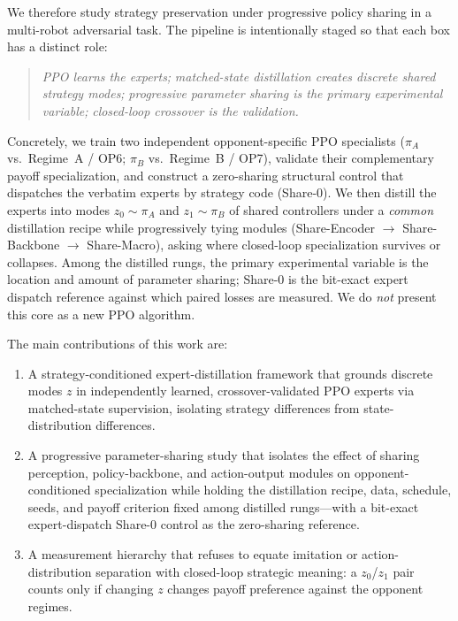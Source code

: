 We therefore study strategy preservation under progressive policy sharing in a
multi-robot adversarial task. The pipeline is intentionally staged so that each
box has a distinct role:
\begin{quote}
\emph{PPO learns the experts;}
\emph{matched-state distillation creates discrete shared strategy modes;}
\emph{progressive parameter sharing is the primary experimental variable;}
\emph{closed-loop crossover is the validation.}
\end{quote}
Concretely, we train two independent opponent-specific PPO specialists
($\pi_A$ vs.\ Regime~A / OP6; $\pi_B$ vs.\ Regime~B / OP7), validate their
complementary payoff specialization, and construct a zero-sharing structural
control that dispatches the verbatim experts by strategy code (Share-0). We then
distill the experts into modes $z_0\!\sim\!\pi_A$ and $z_1\!\sim\!\pi_B$ of
shared controllers under a \emph{common} distillation recipe while progressively
tying modules (Share-Encoder $\rightarrow$ Share-Backbone $\rightarrow$
Share-Macro), asking where closed-loop specialization survives or collapses.
Among the distilled rungs, the primary experimental variable is the location and
amount of parameter sharing; Share-0 is the bit-exact expert dispatch reference
against which paired losses are measured. We do \emph{not} present this core as
a new PPO algorithm.

The main contributions of this work are:
\begin{enumerate}
  \item A strategy-conditioned expert-distillation framework that grounds
  discrete modes $z$ in independently learned, crossover-validated PPO experts
  via matched-state supervision, isolating strategy differences from
  state-distribution differences.
  \item A progressive parameter-sharing study that isolates the effect of
  sharing perception, policy-backbone, and action-output modules on
  opponent-conditioned specialization while holding the distillation recipe,
  data, schedule, seeds, and payoff criterion fixed among distilled rungs---with
  a bit-exact expert-dispatch Share-0 control as the zero-sharing reference.
  \item A measurement hierarchy that refuses to equate imitation or
  action-distribution separation with closed-loop strategic meaning: a
  $z_0$/$z_1$ pair counts only if changing $z$ changes payoff preference
  against the opponent regimes.
\end{enumerate}

